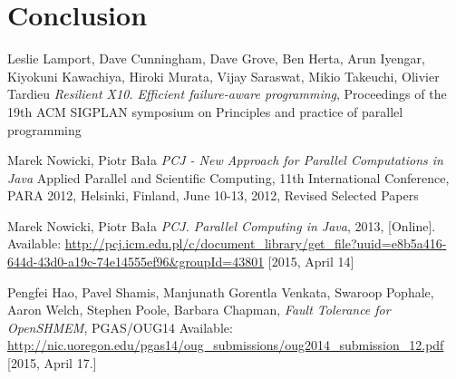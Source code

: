 \documentclass{llncs}
\begin{document}
\section{Conclusion}

\begin{thebibliography}{1}

Leslie Lamport, Dave Cunningham, Dave Grove, Ben Herta, Arun Iyengar, Kiyokuni Kawachiya, Hiroki Murata, Vijay Saraswat, Mikio Takeuchi, Olivier Tardieu
\emph{Resilient X10. Efficient failure-aware programming},
Proceedings of the 19th ACM SIGPLAN symposium on Principles and practice of parallel programming

Marek Nowicki, Piotr Bała
\emph{PCJ - New Approach for Parallel Computations in Java}
Applied Parallel and Scientific Computing, 11th International Conference, PARA 2012, Helsinki, Finland, June 10-13, 2012, Revised Selected Papers

Marek Nowicki, Piotr Bała
\emph{PCJ. Parallel Computing in Java}, 2013, [Online]. Available: \url{http://pcj.icm.edu.pl/c/document_library/get_file?uuid=e8b5a416-644d-43d0-a19c-74e14555ef96&groupId=43801} [2015, April 14]

Pengfei Hao, Pavel Shamis, Manjunath Gorentla Venkata, Swaroop Pophale, Aaron Welch, Stephen Poole, Barbara Chapman, \emph{Fault Tolerance for OpenSHMEM}, PGAS/OUG14
Available: \url{http://nic.uoregon.edu/pgas14/oug_submissions/oug2014_submission_12.pdf} [2015, April 17.]

\end{thebibliography}
\end{document}
